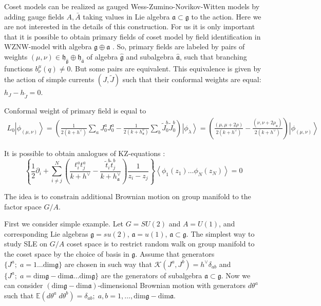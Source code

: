 \documentclass[a4paper]{jpconf}
\theoremstyle{definition}
\newcommand{\gf}{\mathfrak{g}}
\newcommand{\af}{\mathfrak{a}}
\newcommand{\hf}{\mathfrak{h}}
\newcommand{\gfh}{\hat{\mathfrak{g}}}
\newcommand{\afh}{\hat{\mathfrak{a}}}
\theoremstyle{definition} \newtheorem{Def}{Definition}
\begin{document}
Coset models can be realized as gauged Wess-Zumino-Novikov-Witten models by adding gauge fields  $A, \bar{A}$ taking values in Lie algebra $\af\subset \gf$ to the action\cite{gawdzki1988g}. Here we are not interested in the details of this construction. For us it is only important that it is possible to obtain primary fields of coset model by field identification in WZNW-model with algebra $\gf\oplus \af$ \cite{fuchs1996resolution,schellekens1990field}. 
So, primary fields are labeled by pairs of weights $(\mu,\nu)\in \hf_{\gfh}\oplus \hf_{\afh}$  of algebra $\gfh$ and subalgebra $\afh$, such that branching functions $b^{\mu}_{\nu}(q)\neq 0$. But some pairs are equivalent. This equivalence is given by the action of simple currents $(J,\tilde{J})$ such that their conformal weights are equal:  $h_{J}-h_{\tilde{J}}=0$. 

Conformal weight of primary field is equal to
\begin{multline}
  L_0\left|\phi_{(\mu,\nu)}\right>=\left(\frac{1}{2(k+h^{\vee})}\sum_aJ^a_0J^a_0-\frac{1}{2(k+h_{\af}^v)}\sum_b \tilde{J}^b_0 \tilde{J}^b_0 \right)
  \left|\phi_{\lambda}\right>=
  \left(\frac{(\mu,\mu+2\rho)}{2(k+h^{\vee})}-\frac{(\nu,\nu+2\rho_{\af})}{2(k+h^{\vee})}\right)\left|\phi_{(\mu,\nu)}\right>
\end{multline}


It is possible to obtain analogues of KZ-equations \cite{kogan1997knizhnik}:
\begin{equation*}
  \left\{\frac{1}{2}\partial_{i} + \sum_{i\neq j}^{N}\left(\frac{t^{a}_{i}t^{a}_{j}}{k+h^{\vee}}-\frac{\tilde t^{b}_{i}\tilde t^{b}_{j}}{k+h^{\vee}_{\af}}\right)\frac{1}{z_{i}-z_{j}}\right\} \left<\phi_{1}(z_{1})\dots \phi_{N}(z_{N})\right>=0
\end{equation*}


The idea is to constrain additional Brownian motion on group manifold to the factor space $G/A$. 

First we consider simple example. Let $G=SU(2)$ and $A=U(1)$, and corresponding Lie algebras $\gf=su(2)$, $\af=u(1)$, $\af\subset\gf$.
The simplest way to study SLE on $G/A$ coset space is to restrict random walk on group manifold to the coset space by the choice of basis in $\gf$. Assume that generators $\{J^{a};\; a=1\dots \mathrm{dim}\gf\}$ are chosen in such way that $\mathcal{K}(J^{a},J^{b})=h^{\vee}\delta_{ab}$ and $\{J^{a};\; a=\mathrm{dim}\gf-\mathrm{dim}\af\dots \mathrm{dim}\gf\}$ are the generators of subalgebra $\af\subset \gf$. Now we can consider $(\mathrm{dim}\gf-\mathrm{dim}\af)$-dimensional Brownian motion with generators $d\theta^{a}$ such that $\mathbb{E}(d\theta^{a} \; d\theta^{b})=\delta_{ab};\; a,b=1,\dots,\mathrm{dim}\gf-\mathrm{dim}\af$.
\end{document}
